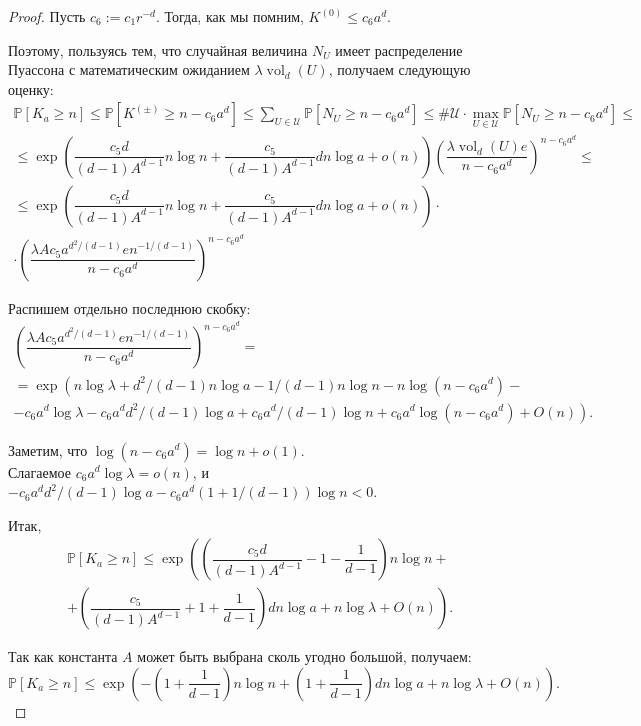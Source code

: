 \documentclass[12pt]{article}
\theoremstyle{plain}
\theoremstyle{definition}
\theoremstyle{remark}
\def\geq{\geqslant}
\def\leq{\leqslant}
\DeclareMathOperator{\vol}{vol}
\newcommand{\PP}{\mathbb{P}}
\begin{document}
\begin{proof}
Пусть $c_6 := c_1r^{-d}$. Тогда, как мы помним, $K^{(0)}\leq c_6a^d.$

Поэтому, пользуясь тем, что случайная величина $N_U$  имеет распределение Пуассона с математическим ожиданием $\lambda\vol_d(U)$, получаем следующую оценку: 
\begin{multline*}
    \PP[K_a\geq n] \leq \PP[K^{(\pm)} \geq n-c_6a^d] \leq \sum_{U\in\mathcal{U}}\PP[N_U \geq n-c_6a^d] \leq
    \#\mathcal{U}\cdot\max_{U\in\mathcal{U}}\PP[N_U\geq n- c_6a^d] \leq \\
    \leq  \exp \left(\dfrac{c_5d}{(d-1)A^{d-1}}n\log n + \dfrac{c_5}{(d-1)A^{d-1}}dn\log a + o(n)\right) \left(\dfrac{\lambda\vol_d(U)e}{n-c_6a^d}\right)^{n-c_6a^d} \leq \\
    \leq 
    \exp \left(\dfrac{c_5d}{(d-1)A^{d-1}}n\log n + \dfrac{c_5}{(d-1)A^{d-1}}dn\log a + o(n)\right)\cdot\\
    \cdot\left(\dfrac{\lambda Ac_5a^{d^2/(d-1)}en^{-1/(d-1)}}{n-c_6a^d}\right)^{n-c_6a^d}
\end{multline*}

Распишем отдельно последнюю скобку:
\begin{multline*}
    \left(\dfrac{\lambda Ac_5a^{d^2/(d-1)}en^{-1/(d-1)}}{n-c_6a^d}\right)^{n-c_6a^d} = \\
    = \exp\left(n\log\lambda + d^2/(d-1)n\log a - 1/(d-1)n\log n - n\log(n-c_6a^d) -\right.\\
    \left.- c_6a^d\log\lambda - c_6a^dd^2/(d-1)\log a + c_6a^d/(d-1)\log n + c_6a^d\log (n-c_6a^d) + O(n)\right).
\end{multline*}

Заметим, что $\log (n - c_6a^d) = \log n + o(1).$\\ Слагаемое $c_6a^d\log\lambda = o(n)$, и $- c_6a^dd^2/(d-1)\log a - c_6a^d(1+1/(d-1))\log n < 0$.

Итак,
\begin{multline*}
    \PP[K_a\geq n]\leq
     \exp\left(\left(\dfrac{c_5d}{(d-1)A^{d-1}} - 1 - \dfrac{1}{d-1}\right)n\log n + \right.\\
    +\left.\left(\dfrac{c_5}{(d-1)A^{d-1}} + 1 + \dfrac{1}{d-1}\right)dn\log a + n\log \lambda + O(n) \right).
\end{multline*}{}





Так как константа $A$ может быть выбрана сколь угодно большой, получаем:
\begin{equation*}
    \PP[K_a \geq n] \leq 
     \exp \left(-\left(1+\dfrac{1}{d-1}\right)n\log n + \left(1+\dfrac{1}{d-1}\right)dn\log a + n\log \lambda + O(n) \right).
\end{equation*}{}
\end{proof}{}
\end{document}
